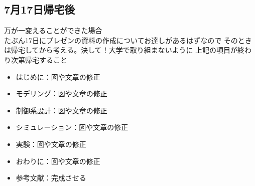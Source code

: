  \subsection{7月17日帰宅後}
 万が一変えることができた場合\\
 たぶん17日にプレゼンの資料の作成についてお達しがあるはずなので
 そのときは帰宅してから考える。決して！大学で取り組まないように
 上記の項目が終わり次第帰宅すること
 \begin{itemize}
   \item はじめに：図や文章の修正
   \item モデリング：図や文章の修正
   \item 制御系設計：図や文章の修正
   \item シミュレーション：図や文章の修正
   \item 実験：図や文章の修正
   \item おわりに：図や文章の修正
   \item 参考文献：完成させる
 \end{itemize}
